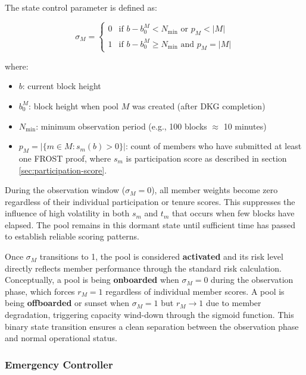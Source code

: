 The state control parameter is defined as:

\begin{equation}
    \label{eq:state-control-parameter}
    \sigma_M = \begin{cases}
        0 & \text{if } b - b_0^M < N_{\min} \text{ or } p_M < |M|     \\
        1 & \text{if } b - b_0^M \geq N_{\min} \text{ and } p_M = |M|
    \end{cases}
\end{equation}

where:
\begin{itemize}
    \item $b$: current block height
    \item $b_0^M$: block height when pool $M$ was created (after DKG completion)
    \item $N_{\min}$: minimum observation period (e.g., 100 blocks $\approx$ 10 minutes)
    \item $p_M = |\{m \in M : s_m(b) > 0\}|$: count of members who have submitted at least one FROST proof, where $s_m$ is participation score as described in section \ref{sec:participation-score}.
\end{itemize}

During the observation window ($\sigma_M = 0$), all member weights become zero regardless of their individual participation or tenure scores. This suppresses the influence of high volatility in both $s_m$ and $t_m$ that occurs when few blocks have elapsed. The pool remains in this dormant state until sufficient time has passed to establish reliable scoring patterns.

Once $\sigma_M$ transitions to 1, the pool is considered \textbf{activated} and its risk level directly reflects member performance through the standard risk calculation. Conceptually, a pool is being \textbf{onboarded} when $\sigma_M = 0$ during the observation phase, which forces $r_M = 1$ regardless of individual member scores. A pool is being \textbf{offboarded} or sunset when $\sigma_M = 1$ but $r_M \to 1$ due to member degradation, triggering capacity wind-down through the sigmoid function. This binary state transition ensures a clean separation between the observation phase and normal operational status.

\subsubsection{Emergency Controller}
\label{sec:emergency-controller}

